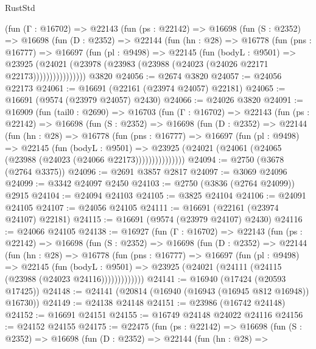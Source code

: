 \begin{lexlean}{RustStd}
\begin{coremodule}
        (fun (Γ : @16702) =>
        @22143
          (fun (ps : @22142) =>
          @16698
            (fun (S : @2352) =>
            @16698
              (fun (D : @2352) =>
              @22144
                (fun (hn : @28) =>
                @16778
                  (fun (pns : @16777) =>
                  @16697
                    (fun (pl : @9498) =>
                    @22145
                      (fun (bodyL : @9501) =>
                      @23925
                        (@24021
                          (@23978 (@23983 (@23988 (@24023 (@24026 @22171 @22173))))))))))))))))
    @3820
@24056 := @2674 @3820
@24057 := @24056 @22173
@24061 := @16691 (@22161 (@23974 @24057) @22181)
@24065 := @16691 (@9574 (@23979 @24057) @2430)
@24066 := @24026 @3820
@24091 := @16909
    (fun (tail0 : @2690) =>
    @16703
      (fun (Γ : @16702) =>
      @22143
        (fun (ps : @22142) =>
        @16698
          (fun (S : @2352) =>
          @16698
            (fun (D : @2352) =>
            @22144
              (fun (hn : @28) =>
              @16778
                (fun (pns : @16777) =>
                @16697
                  (fun (pl : @9498) =>
                  @22145
                    (fun (bodyL : @9501) =>
                    @23925 (@24021 (@24061 (@24065 (@23988 (@24023 (@24066 @22173)))))))))))))))
@24094 := @2750 (@3678 (@2764 @3375))
@24096 := @2691 @3857 @2817
@24097 := @3069 @24096
@24099 := @3342 @24097 @2450
@24103 := @2750 (@3836 (@2764 @24099)) @2915
@24104 := @24094 @24103
@24105 := @3825 @24104
@24106 := @24091 @24105
@24107 := @24056 @24105
@24111 := @16691 (@22161 (@23974 @24107) @22181)
@24115 := @16691 (@9574 (@23979 @24107) @2430)
@24116 := @24066 @24105
@24138 := @16927
    (fun (Γ : @16702) =>
    @22143
      (fun (ps : @22142) =>
      @16698
        (fun (S : @2352) =>
        @16698
          (fun (D : @2352) =>
          @22144
            (fun (hn : @28) =>
            @16778
              (fun (pns : @16777) =>
              @16697
                (fun (pl : @9498) =>
                @22145
                  (fun (bodyL : @9501) =>
                  @23925 (@24021 (@24111 (@24115 (@23988 (@24023 @24116)))))))))))))
@24141 := @16940 (@17424 (@20593 @17425))
@24148 := @24141 (@20814 (@16940 (@16943 (@16945 @812 @16948)) @16730))
@24149 := @24138 @24148
@24151 := @23986 (@16742 @24148)
@24152 := @16691 @24151
@24155 := @16749 @24148 @24022 @24116
@24156 := @24152 @24155
@24175 := @22475
    (fun (ps : @22142) =>
    @16698
      (fun (S : @2352) =>
      @16698
        (fun (D : @2352) =>
        @22144
          (fun (hn : @28) =>

\end{coremodule}
\end{lexlean}
